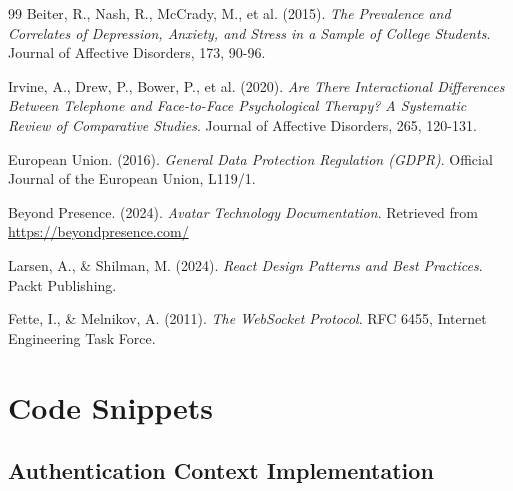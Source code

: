 \documentclass[11pt,a4paper]{article}
\begin{document}
\begin{thebibliography}{99}
Beiter, R., Nash, R., McCrady, M., et al. (2015). 
\textit{The Prevalence and Correlates of Depression, Anxiety, and Stress in a Sample of College Students}. 
Journal of Affective Disorders, 173, 90-96.

Irvine, A., Drew, P., Bower, P., et al. (2020). 
\textit{Are There Interactional Differences Between Telephone and Face-to-Face Psychological Therapy? A Systematic Review of Comparative Studies}. 
Journal of Affective Disorders, 265, 120-131.

European Union. (2016). \textit{General Data Protection Regulation (GDPR)}. 
Official Journal of the European Union, L119/1.

Beyond Presence. (2024). \textit{Avatar Technology Documentation}. 
Retrieved from \url{https://beyondpresence.com/}

Larsen, A., \& Shilman, M. (2024). \textit{React Design Patterns and Best Practices}. 
Packt Publishing.

Fette, I., \& Melnikov, A. (2011). \textit{The WebSocket Protocol}. 
RFC 6455, Internet Engineering Task Force.

\end{thebibliography}

\newpage

\appendix

\section{Code Snippets}

\subsection{Authentication Context Implementation}
\end{document}
